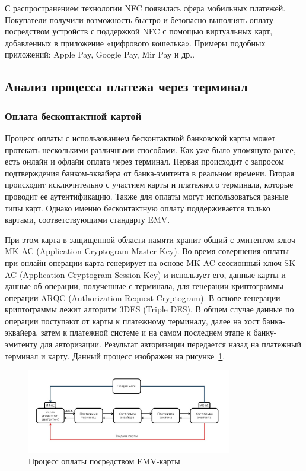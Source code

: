 С распространением технологии NFC появилась сфера мобильных платежей.
Покупатели получили возможность быстро и безопасно выполнять оплату посредством устройств с поддержкой NFC с помощью виртуальных карт, добавленных в приложение «цифрового кошелька».
Примеры подобных приложений: Apple Pay, Google Pay, Mir Pay и др..


\subsection{Анализ процесса платежа через терминал}

\subsubsection{Оплата бесконтактной картой}
\label{subsubsec:contactless_payment}

Процесс оплаты с использованием бесконтактной банковской карты может протекать несколькими различными способами.
Как уже было упомянуто ранее, есть онлайн и офлайн оплата через терминал.
Первая происходит с запросом подтверждения банком-эквайера от банка-эмитента в реальном времени.
Вторая происходит исключительно с участием карты и платежного терминала, которые проводит ее аутентификацию.
Также для оплаты могут использоваться разные типы карт.
Однако именно бесконтактную оплату поддерживается только картами, соответствующими стандарту EMV.

При этом карта в защищенной области памяти хранит общий с эмитентом ключ MK-AC (Application Cryptogram Master Key).
Во время совершения оплаты при онлайн-операции карта генерирует на основе MK-AC сессионный ключ SK-AC (Application Cryptogram Session Key) и использует его, данные карты и данные об операции, полученные с терминала, для генерации криптограммы операции ARQC (Authorization Request Cryptogram).
В основе генерации криптограммы лежит алгоритм 3DES (Triple DES).
В общем случае данные по операции поступают от карты к платежному терминалу, далее на хост банка-эквайера, затем к платежной системе и на самом последнем этапе к банку-эмитенту для авторизации.
Результат авторизации передается назад на платежный терминал и карту.
Данный процесс изображен на рисунке~\ref{fig:emv_card_payment}.

\begin{figure}[H]
    \centering
    \includegraphics[width=0.8\textwidth]{images/research/emv_card_payment}
    \caption{\centering Процесс оплаты посредством EMV-карты}
    \label{fig:emv_card_payment}
\end{figure}

